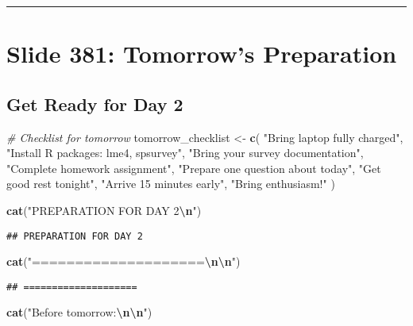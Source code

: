 \documentclass[
]{article}
\newenvironment{Shaded}{\begin{snugshade}}{\end{snugshade}}
\newcommand{\CommentTok}[1]{\textcolor[rgb]{0.56,0.35,0.01}{\textit{#1}}}
\newcommand{\FunctionTok}[1]{\textcolor[rgb]{0.13,0.29,0.53}{\textbf{#1}}}
\newcommand{\NormalTok}[1]{#1}
\newcommand{\OtherTok}[1]{\textcolor[rgb]{0.56,0.35,0.01}{#1}}
\newcommand{\SpecialCharTok}[1]{\textcolor[rgb]{0.81,0.36,0.00}{\textbf{#1}}}
\newcommand{\StringTok}[1]{\textcolor[rgb]{0.31,0.60,0.02}{#1}}
\begin{document}
\begin{center}\rule{0.5\linewidth}{0.5pt}\end{center}

\section{Slide 381: Tomorrow's
Preparation}\label{slide-381-tomorrows-preparation}

\subsection{Get Ready for Day 2}\label{get-ready-for-day-2}

\begin{Shaded}
\begin{Highlighting}[]
\CommentTok{\# Checklist for tomorrow}
\NormalTok{tomorrow\_checklist }\OtherTok{\textless{}{-}} \FunctionTok{c}\NormalTok{(}
  \StringTok{"Bring laptop fully charged"}\NormalTok{,}
  \StringTok{"Install R packages: lme4, spsurvey"}\NormalTok{,}
  \StringTok{"Bring your survey documentation"}\NormalTok{,}
  \StringTok{"Complete homework assignment"}\NormalTok{,}
  \StringTok{"Prepare one question about today"}\NormalTok{,}
  \StringTok{"Get good rest tonight"}\NormalTok{,}
  \StringTok{"Arrive 15 minutes early"}\NormalTok{,}
  \StringTok{"Bring enthusiasm!"}
\NormalTok{)}

\FunctionTok{cat}\NormalTok{(}\StringTok{"PREPARATION FOR DAY 2}\SpecialCharTok{\textbackslash{}n}\StringTok{"}\NormalTok{)}
\end{Highlighting}
\end{Shaded}

\begin{verbatim}
## PREPARATION FOR DAY 2
\end{verbatim}

\begin{Shaded}
\begin{Highlighting}[]
\FunctionTok{cat}\NormalTok{(}\StringTok{"====================}\SpecialCharTok{\textbackslash{}n\textbackslash{}n}\StringTok{"}\NormalTok{)}
\end{Highlighting}
\end{Shaded}

\begin{verbatim}
## ====================
\end{verbatim}

\begin{Shaded}
\begin{Highlighting}[]
\FunctionTok{cat}\NormalTok{(}\StringTok{"Before tomorrow:}\SpecialCharTok{\textbackslash{}n\textbackslash{}n}\StringTok{"}\NormalTok{)}
\end{Highlighting}
\end{Shaded}
\end{document}
